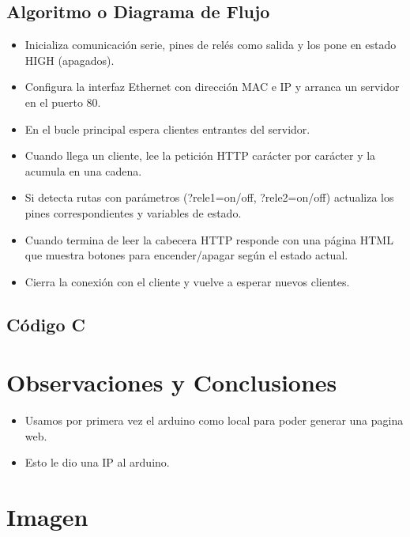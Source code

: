 \documentclass[11pt]{scrartcl}
\begin{document}
\subsection{Algoritmo o Diagrama de Flujo}

\begin{itemize}
  \item Inicializa comunicación serie, pines de relés como salida y los pone en estado HIGH (apagados).
  \item Configura la interfaz Ethernet con dirección MAC e IP y arranca un servidor en el puerto 80.
  \item En el bucle principal espera clientes entrantes del servidor.
  \item Cuando llega un cliente, lee la petición HTTP carácter por carácter y la acumula en una cadena.
  \item Si detecta rutas con parámetros (?rele1=on/off, ?rele2=on/off) actualiza los pines correspondientes y variables de estado.
  \item Cuando termina de leer la cabecera HTTP responde con una página HTML que muestra botones para encender/apagar según el estado actual.
  \item Cierra la conexión con el cliente y vuelve a esperar nuevos clientes.
\end{itemize}

\subsection{ Código C}




\section{Observaciones y Conclusiones}

\begin{itemize}
    \item Usamos por primera vez el arduino como local para poder generar una pagina web. 
    \item Esto le dio una IP al arduino. 
\end{itemize}
  

\section{Imagen}
\end{document}
